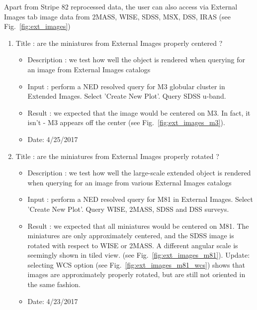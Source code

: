 \documentclass[DM,lsstdraft,toc]{lsstdoc}
\begin{document}
Apart from Stripe 82 reprocessed data, the user can also access  via External Images tab image data from 2MASS, WISE, SDSS, MSX, DSS, IRAS (see Fig.~\ref{fig:ext_images})

\begin{enumerate}
   \item Title : are the miniatures from External Images properly centered ?
    \begin{itemize}
      \item Description : we test how  well the object is rendered when querying for an image from External Images catalogs
      \item Input : perform a NED resolved  query  for M3 globular cluster  in Extended Images. Select  'Create  New Plot'.  Query SDSS   u-band.
      \item Result : we expected that the image would be centered on M3. In fact, it isn't - M3 appears off the center (see Fig.~\ref{fig:ext_images_m3}).
      \item Date: 4/25/2017
    \end{itemize}


    \item Title : are the miniatures from External Images properly rotated ?
    \begin{itemize}
      \item Description : we test how  well the large-scale extended object is rendered when querying for an image from various External Images catalogs
      \item Input : perform a NED resolved  query  for M81  in External Images. Select  'Create  New Plot'.  Query WISE, 2MASS, SDSS and DSS  surveys.
      \item Result : we expected that all miniatures would be centered on M81. The miniatures are only approximately centered, and the SDSS image is rotated with respect to WISE or 2MASS. A different angular scale is seemingly shown in tiled view. (see Fig.~\ref{fig:ext_images_m81}). Update: selecting WCS option (see Fig.~\ref{fig:ext_images_m81_wcs}) shows that images are approximately properly rotated, but are still not oriented in the same fashion.
      \item Date: 4/23/2017
    \end{itemize}


\end{enumerate}
\end{document}

